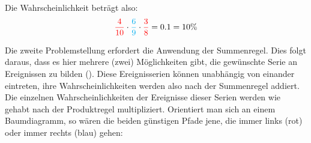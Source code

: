 \vspace{\parskip}

Die Wahrscheinlichkeit betr\"{a}gt also: $${\color{red} \frac{4}{10}} \cdot {\color{cyan} \frac{6}{9}} \cdot {\color{red} \frac{3}{8}} = 0.1 = 10 \%$$

\pagebreak

Die zweite Problemstellung erfordert die Anwendung der Summenregel. Dies folgt daraus, dass es hier mehrere (zwei) M\"{o}glichkeiten gibt, die gew\"{u}nschte Serie an Ereignissen zu bilden (). Diese Ereignisserien k\"{o}nnen unabh\"{a}ngig von einander eintreten, ihre Wahrscheinlichkeiten werden also nach der Summenregel addiert. Die einzelnen Wahrscheinlichkeiten der Ereignisse dieser Serien werden wie gehabt nach der Produktregel multipliziert. Orientiert man sich an einem Baumdiagramm, so w\"{a}ren die beiden g\"{u}nstigen Pfade jene, die immer links (rot) oder immer rechts (blau) gehen:

